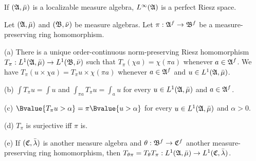 If $(\frak A,\bar\mu)$ is a localizable measure
algebra, $L^{\infty}(\frak A)$ is a perfect Riesz space.
     
     
 Let $(\frak A,\bar\mu)$ and $(\frak B,\bar\nu)$
be measure algebras.   Let $\pi:\frak A^f\to\frak B^f$ be a
measure-preserving ring homomorphism.
     
(a) There is a unique order-continuous norm-preserving Riesz
homomorphism $T_{\pi}:L^1(\frak A,\bar\mu)\to L^1(\frak B,\bar\nu)$ such
that
$T_{\pi}(\chi a)=\chi(\pi a)$ whenever $a\in\frak A^f$.   We have
$T_{\pi}(u\times\chi a)=T_{\pi}u\times\chi(\pi a)$ whenever
$a\in\frak A^f$ and $u\in L^1(\frak A,\bar\mu)$.
     
(b) $\int T_{\pi}u=\int u$ and $\int_{\pi a}T_{\pi}u=\int_au$ for every
$u\in L^1(\frak A,\bar\mu)$ and $a\in\frak A^f$.
     
(c) $\Bvalue{T_{\pi}u>\alpha}=\pi\Bvalue{u>\alpha}$ for every
$u\in L^1(\frak A,\bar\mu)$ and $\alpha>0$.
     
(d) $T_{\pi}$ is surjective iff $\pi$ is.
     
(e) If $(\frak C,\bar\lambda)$ is another measure algebra and
$\theta:\frak B^f\to\frak C^f$ another measure-preserving ring
homomorphism, then $T_{\theta\pi}=T_{\theta}T_{\pi}:
L^1(\frak A,\bar\mu)\to L^1(\frak C,\bar\lambda)$.
     
